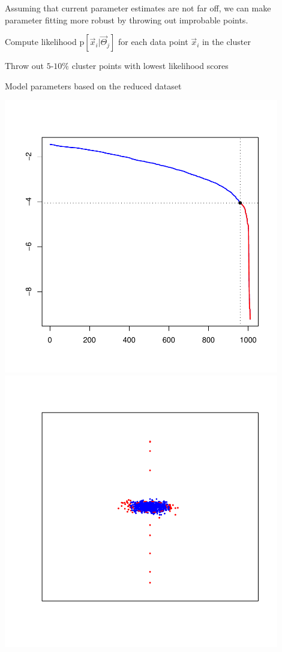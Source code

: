 \documentclass[landscape,footrule]{foils}
\newcommand{\pd}[1]{\mathrm{p}[#1]}
\begin{document}

Assuming that current parameter estimates are not far off, we can make parameter fitting more robust by throwing out improbable points.
\begin{triangles}
\item Compute likelihood $\pd{\vec{x}_i|\vec{\Theta}_j}$  for each data point $\vec{x}_i$ in the cluster
\item Throw out $5$-$10\%$ cluster points with lowest likelihood scores
\item Model parameters based on the reduced dataset 
\end{triangles}


\begin{center}
\hspace*{-1cm}
\includegraphics[width=12cm]{gmm-outliers-1}\hspace*{-2cm}
\includegraphics[width=12cm]{gmm-outliers-2}
\end{center}
\end{document}
